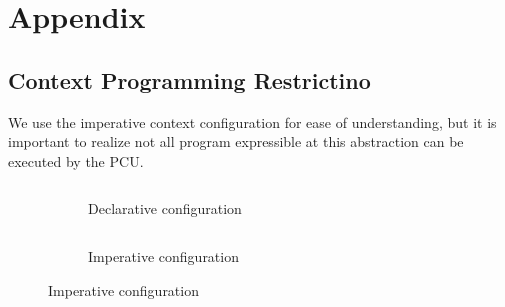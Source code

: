 \chapter{Appendix}

\section{Context Programming Restrictino}

We use the imperative context configuration for ease of understanding, but it is important to
realize not all program expressible at this abstraction can be executed by the PCU.

\begin{figure}
  \begin{subfigure}[b]{0.5\textwidth}
    \inputminted{python}{code/dotproduct.py}
    \caption{Declarative configuration}
  \end{subfigure}
  \hfill
  \begin{subfigure}[b]{0.4\textwidth}
    \inputminted{python}{code/context.py}
    \caption{Imperative configuration}
  \end{subfigure}
\end{figure}

